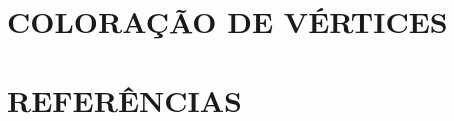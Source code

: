 \chapter{COLORAÇÃO DE VÉRTICES}\label{cap:coloracaoVertices}


\clearpage
\chapter*{REFERÊNCIAS}
\vspace{-0.5em}
\nocite{*}
\printbibliography[heading=none]


